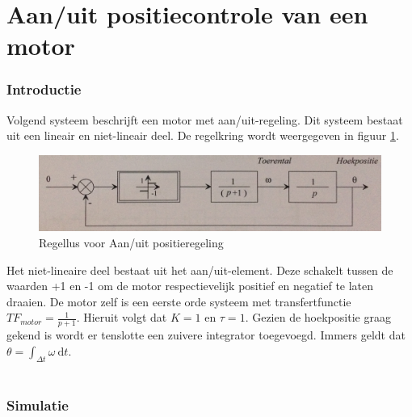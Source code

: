 \documentclass[12pt]{article}
\begin{document}
\part{Aan/uit positiecontrole van een motor}
\section{Introductie}
Volgend systeem beschrijft een motor met aan/uit-regeling. Dit systeem bestaat uit een lineair en niet-lineair deel. De regelkring wordt weergegeven in figuur \ref{regellus}.
\begin{figure}[!h]
	\centering
	\includegraphics[width=\textwidth, keepaspectratio]{regellus.png}
	\caption{Regellus voor Aan/uit positieregeling}
	\label{regellus}	
\end{figure}
\noindent
Het niet-lineaire deel bestaat uit het aan/uit-element. Deze schakelt tussen de waarden +1 en -1 om de motor respectievelijk positief en negatief te laten draaien. De motor zelf is een eerste orde systeem met transfertfunctie $TF_{motor} = \frac{1}{p+1}$. Hieruit volgt dat $K=1$ en $\tau=1$. Gezien de hoekpositie graag gekend is wordt er tenslotte een zuivere integrator toegevoegd. Immers geldt dat $\theta = \int_{\Delta t} \omega \ \mathrm{d}t$. \\ \\
\section{Simulatie}
\end{document}
